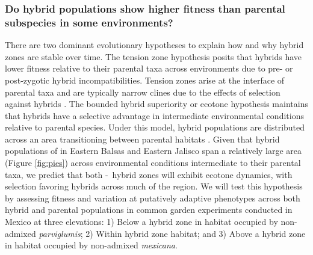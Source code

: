 \subsubsection{Do hybrid populations show higher fitness than parental subspecies in some environments?} 
\label{sss:fitness}

There are two dominant evolutionary hypotheses to explain how and why hybrid zones are stable over time.
The tension zone hypothesis posits that hybrids have lower fitness relative to their parental taxa across environments due to pre- or post-zygotic hybrid incompatibilities.
Tension zones arise at the interface of parental taxa and are typically narrow clines due to the effects of selection against hybrids \citep{abbott2014}.
The bounded hybrid superiority or ecotone hypothesis maintains that hybrids have a selective advantage in intermediate environmental conditions relative to parental species. 
Under this model, hybrid populations are distributed across an area transitioning between parental habitats \citep{abbott2014}.
Given that hybrid populations of in Eastern Balsas and Eastern Jalisco span a relatively large area (Figure \ref{fig:pies}) across environmental conditions intermediate to their parental taxa, we predict that both \zp-\zm\ hybrid zones will exhibit ecotone dynamics, with selection favoring hybrids across much of the region.
We will test this hypothesis by assessing fitness and variation at putatively adaptive phenotypes across both hybrid and parental populations in common garden experiments conducted in Mexico at three elevations: 1) Below a hybrid zone in habitat occupied by non-admixed \emph{parviglumis}; 2) Within hybrid zone habitat; and 3) Above a hybrid zone in habitat occupied by non-admixed \emph{mexicana}. 

